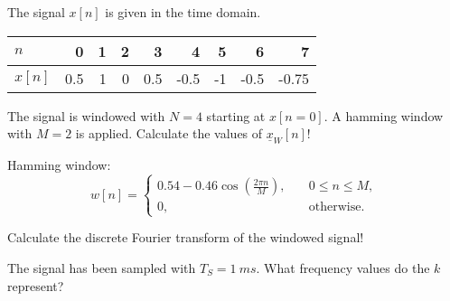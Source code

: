 \begin{solution}
	\begin{tasks}
	\end{tasks}
\end{solution}

\begin{question}[subtitle={Sampling Non-Periodic Signals}]
	The signal $x[n]$ is given in the time domain.
	\begin{table}[H]
		\centering
		\begin{tabular}{|l|r|r|r|r|r|r|r|r|}
			\hline
			$n$ & 0 & 1 & 2 & 3 & 4 & 5 & 6 & 7 \\
			\hline
			\hline
			$x[n]$ & 0.5 & 1 & 0 & 0.5 & -0.5 & -1 & -0.5 & -0.75 \\
			\hline
		\end{tabular}
	\end{table}
	
	\begin{tasks}
		\task
		The signal is windowed with $N = 4$ starting at $x[n = 0]$. A hamming window with $M = 2$ is applied. Calculate the values of $\underline{x}_W[n]$!
		
		Hamming window:
		\begin{equation*}
			w[n] = \begin{cases}0.54 - 0.46 \cos\left(\frac{2 \pi n}{M}\right), &\quad 0 \leq n \leq M,\\ 0, &\quad \text{otherwise}.\end{cases}
		\end{equation*}
		
		\task
		Calculate the discrete Fourier transform of the windowed signal!
		
		\task
		The signal has been sampled with $T_S = \SI{1}{ms}$. What frequency values do the $k$ represent?
	\end{tasks}
\end{question}

